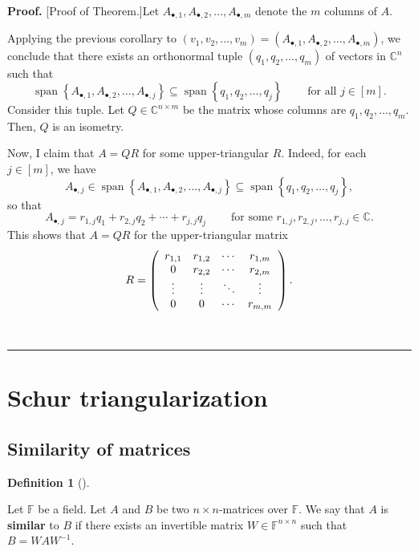 \documentclass[numbers=enddot,12pt,final,onecolumn,notitlepage]{scrartcl}%
\numberwithin{exer}{subsection}
\theoremstyle{definition}
\newtheorem{defi}[theo]{Definition}
\newenvironment{definition}[1][]
{\begin{defi}[#1]\begin{leftbar}}
{\end{leftbar}\end{defi}}
\newenvironment{proof}[1][Proof]{\noindent\textbf{#1.} }{\ \rule{0.5em}{0.5em}}
\begin{document}
\begin{proof}
[Proof of Theorem.]Let $A_{\bullet,1},A_{\bullet,2},\ldots,A_{\bullet,m}$
denote the $m$ columns of $A$.

Applying the previous corollary to $\left(  v_{1},v_{2},\ldots,v_{m}\right)
=\left(  A_{\bullet,1},A_{\bullet,2},\ldots,A_{\bullet,m}\right)  $, we
conclude that there exists an orthonormal tuple $\left(  q_{1},q_{2}%
,\ldots,q_{m}\right)  $ of vectors in $\mathbb{C}^{n}$ such that%
\[
\operatorname*{span}\left\{  A_{\bullet,1},A_{\bullet,2},\ldots,A_{\bullet
,j}\right\}  \subseteq\operatorname*{span}\left\{  q_{1},q_{2},\ldots
,q_{j}\right\}  \ \ \ \ \ \ \ \ \ \ \text{for all }j\in\left[  m\right]  .
\]
Consider this tuple. Let $Q\in\mathbb{C}^{n\times m}$ be the matrix whose
columns are $q_{1},q_{2},\ldots,q_{m}$. Then, $Q$ is an isometry.

Now, I claim that $A=QR$ for some upper-triangular $R$. Indeed, for each
$j\in\left[  m\right]  $, we have%
\[
A_{\bullet,j}\in\operatorname*{span}\left\{  A_{\bullet,1},A_{\bullet
,2},\ldots,A_{\bullet,j}\right\}  \subseteq\operatorname*{span}\left\{
q_{1},q_{2},\ldots,q_{j}\right\}  ,
\]
so that%
\[
A_{\bullet,j}=r_{1,j}q_{1}+r_{2,j}q_{2}+\cdots+r_{j,j}q_{j}%
\ \ \ \ \ \ \ \ \ \ \text{for some }r_{1,j},r_{2,j},\ldots,r_{j,j}%
\in\mathbb{C}.
\]
This shows that $A=QR$ for the upper-triangular matrix%
\[
R=\left(
\begin{array}
[c]{cccc}%
r_{1,1} & r_{1,2} & \cdots & r_{1,m}\\
0 & r_{2,2} & \cdots & r_{2,m}\\
\vdots & \vdots & \ddots & \vdots\\
0 & 0 & \cdots & r_{m,m}%
\end{array}
\right)  .
\]

\end{proof}

\section{Schur triangularization}

\subsection{Similarity of matrices}

\begin{definition}
Let $\mathbb{F}$ be a field. Let $A$ and $B$ be two $n\times n$-matrices over
$\mathbb{F}$. We say that $A$ is \textbf{similar} to $B$ if there exists an
invertible matrix $W\in\mathbb{F}^{n\times n}$ such that $B=WAW^{-1}$.
\end{definition}
\end{document}
